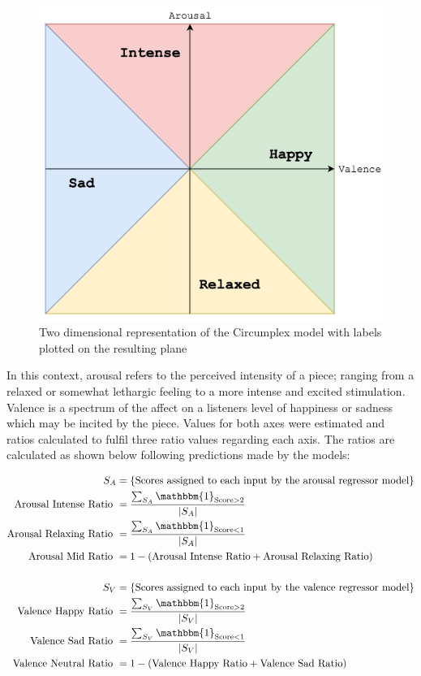 \documentclass[12pt,]{article}
\begin{document}
\begin{figure}
\centering
\includegraphics{Images/circumplex.png}
\caption{Two dimensional representation of the Circumplex model with
labels plotted on the resulting plane}
\end{figure}

In this context, arousal refers to the perceived intensity of a piece;
ranging from a relaxed or somewhat lethargic feeling to a more intense
and excited stimulation. Valence is a spectrum of the affect on a
listeners level of happiness or sadness which may be incited by the
piece. Values for both axes were estimated and ratios calculated to
fulfil three ratio values regarding each axis. The ratios are calculated
as shown below following predictions made by the models:

\[\begin{aligned}
S_A &= \{\text{Scores assigned to each input by the arousal regressor model}\} \\
\text{Arousal Intense Ratio } &= \frac{\sum_{S_A} \mathbbm{1}_{\text{Score}> 2}}{|S_A|} \\
\text{Arousal Relaxing Ratio } &= \frac{\sum_{S_A} \mathbbm{1}_{\text{Score}< 1}}{|S_A|} \\
\text{Arousal Mid Ratio } &= 1 - (\text{Arousal Intense Ratio} + \text{Arousal Relaxing Ratio}) \\ \\
S_V &= \{\text{Scores assigned to each input by the valence regressor model}\} \\
\text{Valence Happy Ratio } &= \frac{\sum_{S_V} \mathbbm{1}_{\text{Score}> 2}}{|S_V|} \\
\text{Valence Sad Ratio } &= \frac{\sum_{S_V} \mathbbm{1}_{\text{Score}< 1}}{|S_V|} \\
\text{Valence Neutral Ratio } &= 1 - (\text{Valence Happy Ratio} + \text{Valence Sad Ratio}) \\
\end{aligned}\]
\end{document}
